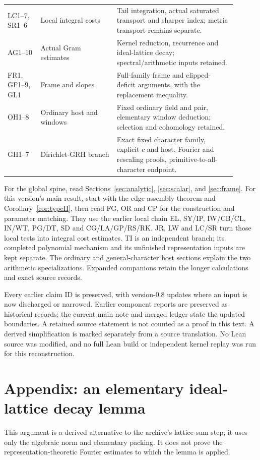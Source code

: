 \documentclass[11pt,a4paper]{article}
\numberwithin{equation}{section}
\theoremstyle{remark}\newtheorem{remark}[theorem]{Remark}
\begin{document}
\begin{longtable}{>{\raggedright\arraybackslash}p{0.13\linewidth}>{\raggedright\arraybackslash}p{0.30\linewidth}>{\raggedright\arraybackslash}p{0.47\linewidth}}
LC1--7, SR1--6 & Local integral costs & Tail integration, actual saturated transport and sharper index; metric transport remains separate.\\[3pt]
AG1--10 & Actual Gram estimates & Kernel reduction, recurrence and ideal-lattice decay; spectral/arithmetic inputs retained.\\[3pt]
FR1, GF1--9, GL1 & Frame and slopes & Full-family frame and clipped-deficit arguments, with the replacement inequality.\\[3pt]
OH1--8 & Ordinary host and windows & Fixed ordinary field and pair, elementary window deduction; selection and cohomology retained.\\[3pt]
GH1--7 & Dirichlet-GRH branch & Exact fixed character family, explicit $c$ and host, Fourier and rescaling proofs, primitive-to-all-character endpoint.\\
\bottomrule
\end{longtable}

For the global spine, read Sections~\ref{sec:analytic},
\ref{sec:scalar}, and \ref{sec:frame}. For this version's main result,
start with the edge-assembly theorem and Corollary~\ref{cor:typeII}, then
read FG, OR and CP for the construction and parameter matching. They use
the earlier local chain EL, SY/IP, IW/CB/CL, IN/WT, PG/DT, SD and
CG/LA/GP/RS/RK. JR, LW and LC/SR turn those local tests into integral
cost estimates. TI is an independent branch; its completed polynomial
mechanism and its unfinished representation inputs are kept separate.
The ordinary and general-character host sections explain the two
arithmetic specializations. Expanded companions retain the longer
calculations and exact source records.

Every earlier claim ID is preserved, with version-0.8 updates where an input is now discharged or narrowed. Earlier component reports are preserved as historical records; the current main note and merged ledger state the updated boundaries. A retained source statement is not counted as a proof in this text. A derived simplification is marked separately from a source translation. No Lean source was modified, and no full Lean build or independent kernel replay was run for this reconstruction.

\section{Appendix: an elementary ideal-lattice decay lemma}
\label{app:ag-lattice}

This argument is a derived alternative to the archive's
lattice-sum step; it uses only the algebraic norm and elementary
packing.  It does not prove the representation-theoretic Fourier
estimates to which the lemma is applied.
\end{document}
